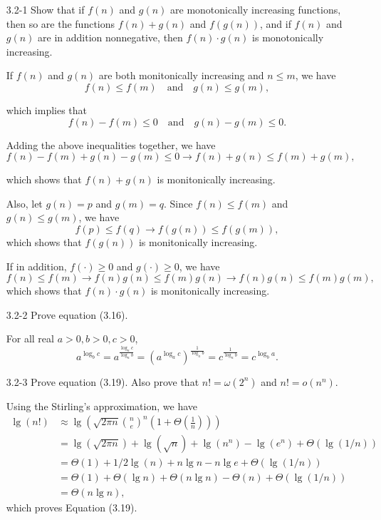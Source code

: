 \begin{enumerate}

\item[3.2{-}1]{Show that if $f(n)$ and $g(n)$ are monotonically increasing
functions, then so are the functions $f(n) + g(n)$ and $f(g(n))$, and if
$f(n)$ and $g(n)$ are in addition nonnegative, then $f(n) \cdot g(n)$ is
monotonically increasing.}

\begin{framed}
If $f(n)$ and $g(n)$ are both monitonically increasing and $n \le m$, we have
\[
f(n) \le f(m) \quad \text{and} \quad g(n) \le g(m),
\]

which implies that
\[
f(n) - f(m) \le 0 \quad \text{and} \quad g(n) - g(m) \le 0.
\]

Adding the above inequalities together, we have
\[
f(n) - f(m) + g(n) - g(m) \le 0 \rightarrow
f(n) + g(n) \le f(m) + g(m),
\]

which shows that $f(n) + g(n)$ is monitonically increasing.

Also, let $g(n) = p$ and $g(m) = q$.
Since $f(n) \le f(m)$ and $g(n) \le g(m)$, we have
\[
f(p) \le f(q) \rightarrow f(g(n)) \le f(g(m)),
\]
which shows that $f(g(n))$ is monitonically increasing.

If in addition, $f(\cdot) \ge 0$ and $g(\cdot) \ge 0$, we have
\[
f(n) \le f(m) \rightarrow f(n) g(n) \le f(m) g(n) \rightarrow f(n) g(n) \le f(m) g(m),
\]
which shows that $f(n) \cdot g(n)$ is monitonically increasing.
\end{framed}

\item[3.2{-}2]{Prove equation (3.16).}

\begin{framed}
For all real $a > 0, b > 0, c > 0$,
\[
a^{\log_b c} = a^{\frac{\log_a c}{\log_a b}}
             = \left(a^{\log_a c}\right)^{\frac{1}{\log_a b}}
             = c^{\frac{1}{\log_a b}}
             = c^{\log_b a}.
\]
\end{framed}

\item[3.2{-}3]{Prove equation (3.19).
Also prove that $n! = \omega(2^n)$ and $n! = o(n^n)$.}

\begin{framed}
Using the Stirling's approximation, we have
\begin{equation*}
\begin{split}
  \lg(n!) & \approx \lg\left(\sqrt{2 \pi n} \binom{n}{e}^n \left(1 + \Theta\left(\frac{1}{n}\right)\right)\right)\\
          & = \lg{(\sqrt{2 \pi n})} + \lg(\sqrt{n}) + \lg(n^n) - \lg(e^n) + \Theta(\lg(1/n))\\
          & = \Theta(1) + 1/2 \lg(n) + n \lg n - n \lg e + \Theta(\lg(1/n))\\
          & = \Theta(1) + \Theta(\lg n) + \Theta(n \lg n) - \Theta(n) + \Theta(\lg(1/n))\\
          & = \Theta(n \lg n),
\end{split}
\end{equation*}
which proves Equation (3.19).


\end{framed}
\end{enumerate}

